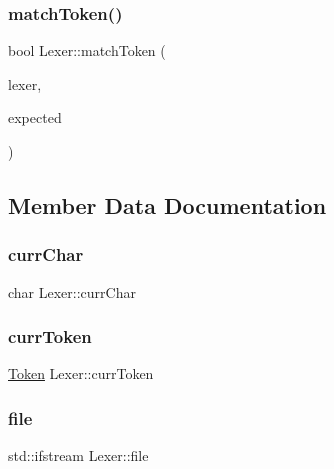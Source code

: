 \mbox{\label{class_lexer_a0e6e248f291aae843df618871563fe46}} 
\subsubsection{\texorpdfstring{matchToken()}{matchToken()}}
{\footnotesize\ttfamily bool Lexer\+::match\+Token (\begin{DoxyParamCaption}\item[{\mbox{\hyperlink{class_lexer}{Lexer}} $\ast$}]{lexer,  }\item[{\mbox{\hyperlink{tanpero__token_8hpp_aa520fbf142ba1e7e659590c07da31921}{Token\+Type}}}]{expected }\end{DoxyParamCaption})}



\subsection{Member Data Documentation}
\mbox{\label{class_lexer_a4ad7e79e52bb27ef561774a8215d1984}} 
\subsubsection{\texorpdfstring{currChar}{currChar}}
{\footnotesize\ttfamily char Lexer\+::curr\+Char}

\mbox{\label{class_lexer_a1337226d0cdbf2bf0a9b8e2eb683de90}} 
\subsubsection{\texorpdfstring{currToken}{currToken}}
{\footnotesize\ttfamily \mbox{\hyperlink{struct_token}{Token}} Lexer\+::curr\+Token}

\mbox{\label{class_lexer_a4583f270e5eed94ae316ae6c0ea2d1e5}} 
\subsubsection{\texorpdfstring{file}{file}}
{\footnotesize\ttfamily std\+::ifstream Lexer\+::file}

